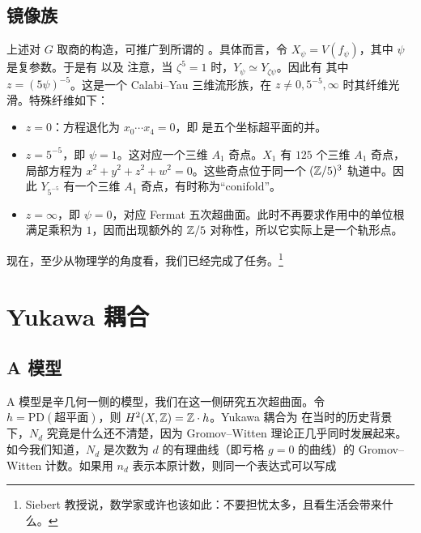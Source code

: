 \subsection{镜像族}
上述对 $G$ 取商的构造，可推广到所谓的 。具体而言，令 $X_\psi=V(f_\psi)$，其中
$\psi$ 是复参数。于是有
以及
注意，当 $\zeta^5=1$ 时，$Y_\psi\simeq Y_{\zeta\psi}$。因此有
其中 $z=(5\psi)^{-5}$。这是一个 Calabi–Yau 三维流形族，在 $z\ne0,5^{-5},\infty$ 时其纤维光滑。特殊纤维如下：
\begin{itemize}
\item $z=0$：方程退化为 $x_0\cdots x_4=0$，即
是五个坐标超平面的并。
\item $z=5^{-5}$，即 $\psi=1$。这对应一个三维 $A_1$ 奇点。$X_1$ 有 $125$ 个三维 $A_1$ 奇点，局部方程为 $x^2+y^2+z^2+w^2=0$。这些奇点位于同一个 $(\mathbb Z/5)^3$ 轨道中。因此 $Y_{5^{-5}}$ 有一个三维 $A_1$ 奇点，有时称为“conifold”。
\item $z=\infty$，即 $\psi=0$，对应 Fermat 五次超曲面。此时不再要求作用中的单位根满足乘积为 $1$，因而出现额外的 $\mathbb Z/5$ 对称性，所以它实际上是一个轨形点。
\end{itemize}
现在，至少从物理学的角度看，我们已经完成了任务。\footnote{Siebert 教授说，数学家或许也该如此：不要担忧太多，且看生活会带来什么。}
\section{Yukawa 耦合}
\subsection{A 模型}
A 模型是辛几何一侧的模型，我们在这一侧研究五次超曲面。令 $h=\mathrm{PD}(\text{超平面})$，则 $H^2(X,\mathbb Z)=\mathbb Z\cdot h$。Yukawa 耦合为
在当时的历史背景下，$N_d$ 究竟是什么还不清楚，因为 Gromov–Witten 理论正几乎同时发展起来。如今我们知道，$N_d$ 是次数为 $d$ 的有理曲线（即亏格 $g=0$ 的曲线）的 Gromov–Witten 计数。如果用 $n_d$ 表示本原计数，则同一个表达式可以写成

